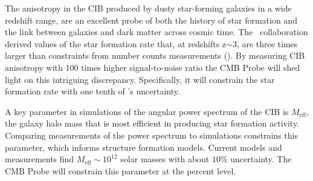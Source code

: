 

The anisotropy in the \ac{CIB} produced by dusty star-forming galaxies in a wide redshift range, are
an excellent probe of both the history of star formation and the link between
galaxies and dark matter across cosmic time. The \planck\ collaboration 
derived values of the star formation rate that,
at redshifts z$\mathrm{\sim3}$, are three times larger 
than constraints from number counts measurements (\cite{planck2014-XXX,planckXVIII,madau2014}).
By measuring \ac{CIB} anisotropy with 100 times higher signal-to-noise ratio
the CMB Probe will shed light on this intriguing discrepancy. 
Specifically, it will constrain the star formation rate with one tenth of \planck 's uncertainty. 


A key parameter in simulations of the angular power spectrum of the \ac{CIB} 
is $M_{\mathrm{eff}}$, the galaxy halo mass that is most efficient in producing star 
formation activity. Comparing measurements of the power spectrum to simulations
constrains this parameter, which informs structure formation models. Current models and measurements 
find $M_{\mathrm{eff}}\sim 10^{12}$ solar masses with about $\mathrm{10\%}$ uncertainty. 
The CMB Probe will constrain this parameter at the percent level.



